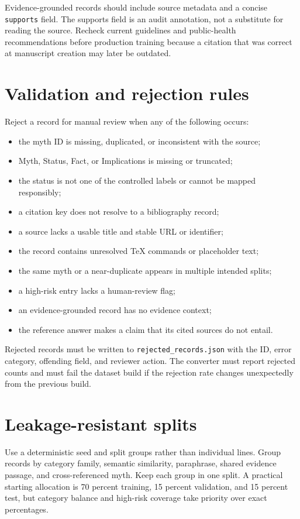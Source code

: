 \documentclass[11pt,oneside]{book}
\begin{document}
Evidence-grounded records should include source metadata and a concise \texttt{supports} field. The supports field is an audit annotation, not a substitute for reading the source. Recheck current guidelines and public-health recommendations before production training because a citation that was correct at manuscript creation may later be outdated.

\section{Validation and rejection rules}

Reject a record for manual review when any of the following occurs:

\begin{itemize}
\item the myth ID is missing, duplicated, or inconsistent with the source;
\item Myth, Status, Fact, or Implications is missing or truncated;
\item the status is not one of the controlled labels or cannot be mapped responsibly;
\item a citation key does not resolve to a bibliography record;
\item a source lacks a usable title and stable URL or identifier;
\item the record contains unresolved TeX commands or placeholder text;
\item the same myth or a near-duplicate appears in multiple intended splits;
\item a high-risk entry lacks a human-review flag;
\item an evidence-grounded record has no evidence context;
\item the reference answer makes a claim that its cited sources do not entail.
\end{itemize}

Rejected records must be written to \texttt{rejected\_records.json} with the ID, error category, offending field, and reviewer action. The converter must report rejected counts and must fail the dataset build if the rejection rate changes unexpectedly from the previous build.

\section{Leakage-resistant splits}

Use a deterministic seed and split groups rather than individual lines. Group records by category family, semantic similarity, paraphrase, shared evidence passage, and cross-referenced myth. Keep each group in one split. A practical starting allocation is 70 percent training, 15 percent validation, and 15 percent test, but category balance and high-risk coverage take priority over exact percentages.
\end{document}
